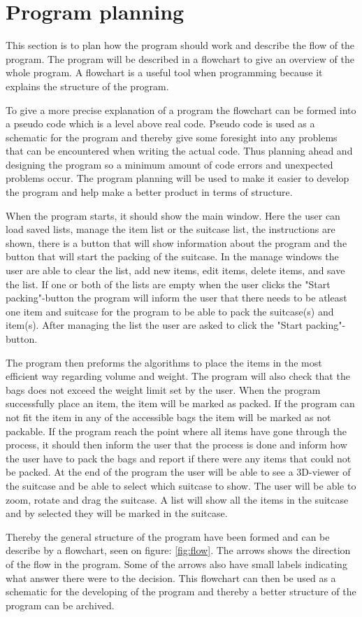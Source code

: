 \section{Program planning}
This section is to plan how the program should work and describe the flow of the program. The program will be described in a flowchart to give an overview of the whole program. A flowchart is a useful tool when programming because it explains the structure of the program.

To give a more precise explanation of a program the flowchart can be formed into a pseudo code which is a level above real code. Pseudo code is used as a schematic for the program and thereby give some foresight into any problems that can be encountered when writing the actual code. Thus planning ahead and designing the program so a minimum amount of code errors and unexpected problems occur.
The program planning will be used to make it easier to develop the program and help make a better product in terms of structure.

When the program starts, it should show the main window. Here the user can load saved lists, manage the item list or the suitcase list, the instructions are shown, there is a button that will show information about the program and the button that will start the packing of the suitcase. In the manage windows the user are able to clear the list, add new items, edit items, delete items, and save the list. If one or both of the lists are empty when the user clicks the "Start packing"-button the program will inform the user that there needs to be atleast one item and suitcase for the program to be able to pack the suitcase(s) and item(s). After managing the list the user are asked to click the "Start packing"-button.

The program then preforms the algorithms to place the items in the most efficient way regarding volume and weight. The program will also check that the bags does not exceed the weight limit set by the user.
When the program successfully place an item, the item will be marked as packed. If the program can not fit the item in any of the accessible bags the item will be marked as not packable. If the program reach the point where all items have gone through the process, it should then inform the user that the process is done and inform how the user have to pack the bags and report if there were any items that could not be packed.
At the end of the program the user will be able to see a 3D-viewer of the suitcase and be able to select which suitcase to show. The user will be able to zoom, rotate and drag the suitcase. A list will show all the items in the suitcase and by selected they will be marked in the suitcase.


Thereby the general structure of the program have been formed and can be describe by a flowchart, seen on figure: \ref{fig:flow}.
The arrows shows the direction of the flow in the program. Some of the arrows also have small labels indicating what answer there were to the decision.
This flowchart can then be used as a schematic for the developing of the program and thereby a better structure of the program can be archived.